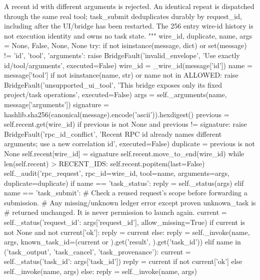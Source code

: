         A recent id with different arguments is rejected. An identical repeat is
        dispatched through the same real tool; task_submit deduplicates durably
        by request_id, including after the UI/bridge has been restarted. The 256
        entry wire-id history is not execution identity and owns no task state.
        """
        wire_id, duplicate, name, args = None, False, None, None
        try:
            if not isinstance(message, dict) or set(message) != {'id', 'tool', 'arguments'}:
                raise BridgeFault('invalid_envelope', 'Use exactly id/tool/arguments', executed=False)
            wire_id = _wire_id(message['id'])
            name = message['tool']
            if not isinstance(name, str) or name not in ALLOWED:
                raise BridgeFault('unsupported_ui_tool', 'This bridge exposes only its fixed project/task operations', executed=False)
            args = self._arguments(name, message['arguments'])
            signature = hashlib.sha256(canonical(message).encode('ascii')).hexdigest()
            previous = self.recent.get(wire_id)
            if previous is not None and previous != signature:
                raise BridgeFault('rpc_id_conflict', 'Recent RPC id already names different arguments; use a new correlation id', executed=False)
            duplicate = previous is not None
            self.recent[wire_id] = signature
            self.recent.move_to_end(wire_id)
            while len(self.recent) > RECENT_IDS:
                self.recent.popitem(last=False)
            self._audit('rpc_request', rpc_id=wire_id, tool=name, arguments=args, duplicate=duplicate)
            if name == 'task_status':
                reply = self._status(args)
            elif name == 'task_submit':
                # Check a reused request's scope before forwarding a submission.
                # Any missing/unknown ledger error except proven unknown_task is
                # returned unchanged. It is never permission to launch again.
                current = self._status({'request_id': args['request_id']}, allow_missing=True)
                if current is not None and not current['ok']:
                    reply = current
                else:
                    reply = self._invoke(name, args, known_task_id=(current or {}).get('result', {}).get('task_id'))
            elif name in ('task_output', 'task_cancel', 'task_provenance'):
                current = self._status({'task_id': args['task_id']})
                reply = current if not current['ok'] else self._invoke(name, args)
            else:
                reply = self._invoke(name, args)

